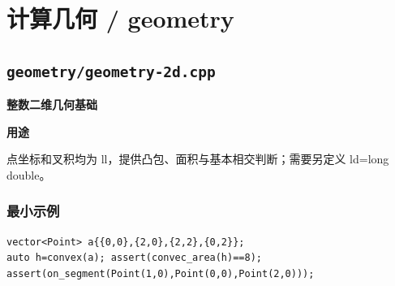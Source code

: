 \documentclass[UTF8,a4paper,10pt]{ctexart}
\newcommand{\TemplUsage}[1]{\textbf{用途}\par #1\par}
\begin{document}
\section{计算几何 / geometry}
\subsection{\texttt{geometry/geometry-2d.cpp}}
\textbf{整数二维几何基础}\par
\TemplUsage{点坐标和叉积均为 ll，提供凸包、面积与基本相交判断；需要另定义 ld=long double。}
\subsubsection*{最小示例}
\begin{lstlisting}
vector<Point> a{{0,0},{2,0},{2,2},{0,2}};
auto h=convex(a); assert(convec_area(h)==8);
assert(on_segment(Point(1,0),Point(0,0),Point(2,0)));
\end{lstlisting}
\end{document}
